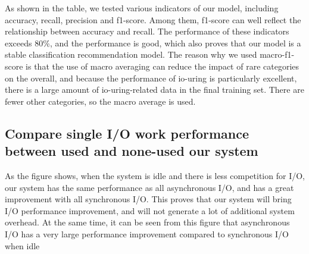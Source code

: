 \documentclass[conference]{IEEEtran}
\begin{document}
As shown in the table, we tested various indicators of our model, including accuracy, recall, precision and f1-score. Among them, f1-score can well reflect the relationship between accuracy and recall. The performance of these indicators exceeds 80\%,
 and the performance is good, which also proves that our model is a stable classification recommendation model. 
 The reason why we used macro-f1-score is that the use of macro averaging can reduce the impact of rare categories on the overall, and because the performance of io-uring is particularly excellent, there is a large amount of io-uring-related data in the final training set. There are fewer other categories, so the macro average is used.



\subsection{Compare single I/O work performance between used and none-used our system}

\datatable


As the figure shows, when the system is idle and there is less competition for I/O, 
our system has the same performance as all asynchronous I/O, and has a great improvement with all synchronous I/O. This proves that our system will bring I/O performance improvement, and will not generate a lot of additional system overhead. 
At the same time, it can be seen from this figure that asynchronous I/O has a very large performance improvement compared to synchronous I/O when idle
\end{document}
